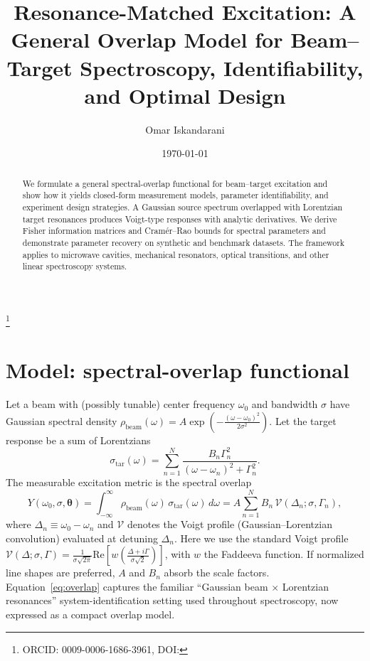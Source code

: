 \documentclass[aps,prb,amsmath,amssymb]{revtex4-2} %
\begin{document}
    \title{Resonance-Matched Excitation: A General Overlap Model for Beam–Target Spectroscopy, Identifiability, and Optimal Design}

    \author{Omar Iskandarani}
    \thanks{ORCID: 0009-0006-1686-3961, DOI: \paperdoi}

    \date{\today}

    \begin{abstract}
        We formulate a general spectral-overlap functional for beam–target excitation and show how it yields closed-form measurement models, parameter identifiability, and experiment design strategies. A Gaussian source spectrum overlapped with Lorentzian target resonances produces Voigt-type responses with analytic derivatives. We derive Fisher information matrices and Cramér–Rao bounds for spectral parameters and demonstrate parameter recovery on synthetic and benchmark datasets. The framework applies to microwave cavities, mechanical resonators, optical transitions, and other linear spectroscopy systems.
    \end{abstract}

    \maketitle

    \section{Model: spectral-overlap functional}
        Let a beam with (possibly tunable) center frequency $\omega_0$ and bandwidth $\sigma$ have Gaussian
        spectral density $\rho_{\mathrm{beam}}(\omega) = A \exp\left(-\frac{(\omega-\omega_0)^2}{2\sigma^2}\right)$.
        Let the target response be a sum of Lorentzians
        \[
            \sigma_{\mathrm{tar}}(\omega) = \sum_{n=1}^{N} \frac{B_n \Gamma_n^2}{(\omega-\omega_n)^2 + \Gamma_n^2}.
        \]
        The measurable excitation metric is the spectral overlap
        \begin{equation}
            Y(\omega_0,\sigma,\boldsymbol{\theta}) = \int_{-\infty}^{\infty} \rho_{\mathrm{beam}}(\omega)\,\sigma_{\mathrm{tar}}(\omega)\,d\omega
            = A \sum_{n=1}^{N} B_n \,\mathcal{V}\left(\Delta_n;\sigma,\Gamma_n\right),
            \label{eq:overlap}
        \end{equation}
        where $\Delta_n \equiv \omega_0-\omega_n$ and $\mathcal{V}$ denotes the Voigt profile (Gaussian--Lorentzian
        convolution) evaluated at detuning $\Delta_n$. Here we use the standard Voigt profile
        $\mathcal{V}(\Delta;\sigma,\Gamma) = \frac{1}{\sigma\sqrt{2\pi}}\mathrm{Re}\left[w\left(\frac{\Delta+i\Gamma}{\sigma\sqrt{2}}\right)\right]$,
        with $w$ the Faddeeva function. If normalized line shapes are preferred, $A$ and $B_n$ absorb the scale
        factors.
        Equation~\eqref{eq:overlap} captures the familiar ``Gaussian beam $\times$ Lorentzian resonances''
        system-identification setting used throughout spectroscopy, now expressed as a compact overlap model.
\end{document}
